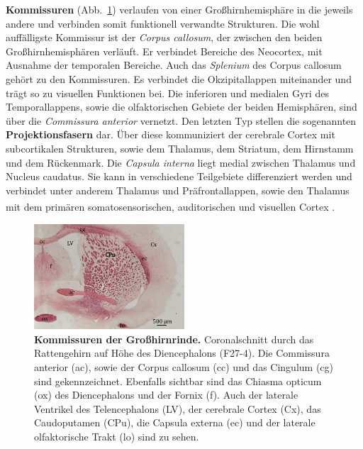 \documentclass[12pt,a4paper,pdftex]{article}
\begin{document}
\noindent \textbf{Kommissuren} (Abb.~\ref{fig:faser_cortico-cortical}) verlaufen von einer Großhirnhemisphäre in die jeweils andere und verbinden somit funktionell verwandte Strukturen. Die wohl auffälligste Kommissur ist der \textit{Corpus callosum}, der zwischen den beiden Großhirnhemisphären verläuft. Er verbindet Bereiche des Neocortex, mit Ausnahme der temporalen Bereiche. Auch das \textit{Splenium} des Corpus callosum gehört zu den Kommissuren. Es verbindet die Okzipitallappen miteinander und trägt so zu visuellen Funktionen bei. Die inferioren und medialen Gyri des Temporallappens, sowie die olfaktorischen Gebiete der beiden Hemisphären, sind über die \textit{Commissura anterior} vernetzt. Den letzten Typ stellen die sogenannten \textbf{Projektionsfasern} dar. Über diese kommuniziert der cerebrale Cortex mit subcortikalen Strukturen, sowie dem Thalamus, dem Striatum, dem Hirnstamm und dem Rückenmark. Die \textit{Capsula interna} liegt  medial zwischen Thalamus und Nucleus caudatus. Sie kann in verschiedene Teilgebiete differenziert werden und verbindet unter anderem Thalamus und Präfrontallappen, sowie den Thalamus mit dem primären somatosensorischen, auditorischen und visuellen Cortex \textsuperscript{\cite[13]{crossman2014neuroanatomy}}.

\begin{figure}[H]
    \centering
    \includegraphics[width=0.5\textwidth]{pictures/Bilder_Jule/Ratte/faser_cortex.png}
    \caption[Kommissuren der Großhirnrinde]{\textbf{Kommissuren der Großhirnrinde.} Coronalschnitt durch das Rattengehirn auf Höhe des Diencephalons (F27-4). Die Commissura anterior (ac), sowie der Corpus callosum (cc) und das Cingulum (cg) sind gekennzeichnet. Ebenfalls sichtbar sind das Chiasma opticum (ox) des Diencephalons und der Fornix (f). Auch der laterale Ventrikel des Telencephalons (LV), der cerebrale Cortex (Cx), das Caudoputamen (CPu), die Capsula externa (ec) und der laterale olfaktorische Trakt (lo) sind zu sehen.}
    \label{fig:faser_cortico-cortical}
\end{figure}
\end{document}
